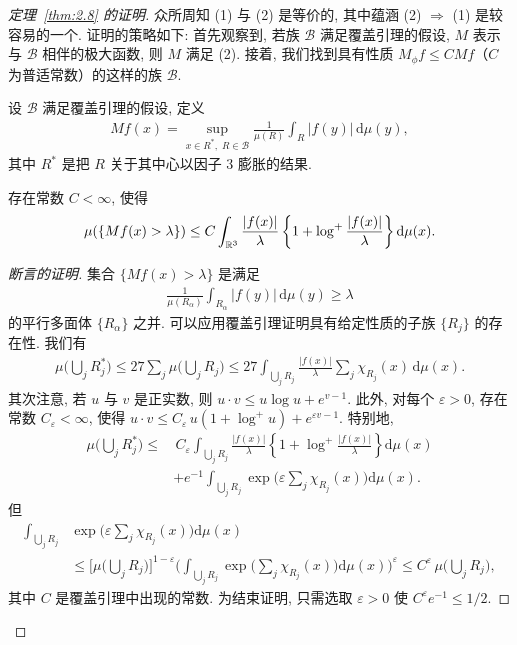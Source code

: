 \begin{proof}[定理~\ref{thm:2.8} 的证明]
众所周知 (1) 与 (2) 是等价的, 其中蕴涵 (2) $\Rightarrow$ (1) 是较容易的一个. 证明的策略如下: 首先观察到, 若族 $\mathcal{B}$ 满足覆盖引理的假设, $M$ 表示与 $\mathcal{B}$ 相伴的极大函数, 则 $M$ 满足 (2). 接着, 我们找到具有性质 $M_{\phi}f \leq CMf$（$C$ 为普适常数）的这样的族 $\mathcal{B}$.

设 $\mathcal{B}$ 满足覆盖引理的假设, 定义
\begin{align*}
  M f(x)=\sup_{x\in R^{*},\;R\in\mathcal{B}}\frac{1}{\mu(R)}\int_{R}|f(y)|\,\mathrm{d}\mu(y),
\end{align*}
其中 $R^{*}$ 是把 $R$ 关于其中心以因子 $3$ 膨胀的结果.

\begin{claim*}
存在常数 $C < \infty$, 使得
\begin{align*}
  \mu(\{M f(x)>\lambda\})\leq C\int_{\mathbb{R}^{3}}\frac{|f(x)|}{\lambda}\left\{1+\log^{+}\frac{|f(x)|}{\lambda}\right\}\mathrm{d}\mu(x).
\end{align*}
\end{claim*}

\begin{proof}[断言的证明]
集合 $\{Mf(x) > \lambda\}$ 是满足
\begin{align*}
  \frac{1}{\mu(R_{\alpha})}\int_{R_{\alpha}}\left|f(y)\right|\,\mathrm{d}\mu(y)\geq\lambda
\end{align*}
的平行多面体 $\{R_\alpha\}$ 之并. 可以应用覆盖引理证明具有给定性质的子族 $\{R_{j}\}$ 的存在性. 我们有
\begin{align*}
  \mu\Big(\bigcup_{j}R_{j}^{*}\Big)
  \leq 27\sum_{j}\mu\Big(\bigcup_{j}R_{j}\Big)
  \leq 27\int_{\bigcup_{j}R_{j}}\frac{|f(x)|}{\lambda}\sum_{j}\chi_{R_{j}}(x)\,\mathrm{d}\mu(x).
\end{align*}
其次注意, 若 $u$ 与 $v$ 是正实数, 则 $u\cdot v \leq u\log u + e^{v-1}$. 此外, 对每个 $\varepsilon > 0$, 存在常数 $C_\varepsilon < \infty$, 使得 $u\cdot v \leq C_\varepsilon\,u(1 + \log^+ u) + e^{\varepsilon v - 1}$. 特别地,
\begin{align*}
  \mu\Big(\bigcup_{j} R_{j}^{*}\Big)
  \leq&\,C_{\varepsilon}\int_{\bigcup_{j} R_{j}}\frac{|f(x)|}{\lambda}\left\{1+\log^{+}\frac{|f(x)|}{\lambda}\right\}\mathrm{d}\mu(x)\\
  &+e^{-1}\int_{\bigcup_{j} R_{j}}\exp\Big(\varepsilon\sum_{j}\chi_{R_{j}}(x)\Big)\mathrm{d}\mu(x).
\end{align*}
但
\begin{align*}
  \int_{\bigcup_{j}R_{j}}&\exp\Big(\varepsilon\sum_{j}\chi_{R_{j}}(x)\Big)\mathrm{d}\mu(x)\\
  &\leq\Big[\mu\Big(\bigcup_{j}R_{j}\Big)\Big]^{1-\varepsilon}
   \Big(\int_{\bigcup_{j}R_{j}}\exp\Big(\sum_{j}\chi_{R_{j}}(x)\Big)\mathrm{d}\mu(x)\Big)^{\varepsilon}
  \leq C^{\varepsilon}\,\mu\Big(\bigcup_{j}R_{j}\Big),
\end{align*}
其中 $C$ 是覆盖引理中出现的常数. 为结束证明, 只需选取 $\varepsilon > 0$ 使 $C^{\varepsilon}e^{-1} \leq 1/2$.
\end{proof}


\end{proof}
